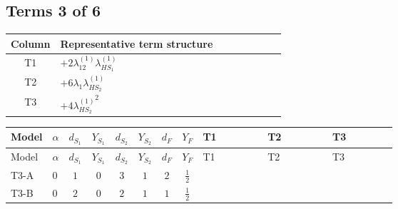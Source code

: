 \documentclass[8pt]{article}
\begin{document}
\begin{landscape}
\subsection*{Terms 3 of 6}
\begin{center}
\begin{tabular}{@{}c >{\raggedright\arraybackslash}p{0.82\linewidth}@{}}
\toprule
Column & Representative term structure \\
\midrule
T1 & \(\displaystyle +2 {\lambda_{12}^{(1)}} {\lambda_{HS_1}^{(1)}}\) \\
\midrule
T2 & \(\displaystyle +6 {\lambda_1} {\lambda_{HS_2}^{(1)}}\) \\
\midrule
T3 & \(\displaystyle +4 {\lambda_{HS_2}^{(1)}}^2\) \\
\midrule
\bottomrule
\end{tabular}
\end{center}
\smallskip
\tiny
\begin{longtable}{@{}llcccccc >{\raggedright\arraybackslash}p{0.21\linewidth} >{\raggedright\arraybackslash}p{0.21\linewidth} >{\raggedright\arraybackslash}p{0.21\linewidth}@{}}
\toprule
Model & $\alpha$ & $d_{S_1}$ & $Y_{S_1}$ & $d_{S_2}$ & $Y_{S_2}$ & $d_F$ & $Y_F$ & T1 & T2 & T3 \\
\midrule
\endfirsthead
\toprule
Model & $\alpha$ & $d_{S_1}$ & $Y_{S_1}$ & $d_{S_2}$ & $Y_{S_2}$ & $d_F$ & $Y_F$ & T1 & T2 & T3 \\
\midrule
\endhead
T3-A & $0$ & $1$ & $0$ & $3$ & $1$ & $2$ & $\frac{1}{2}$ & \scriptsize\adjustbox{max width=\linewidth}{$\begin{gathered} +2 {\lambda_{12}^{(1)}} {\lambda_{HS_1}^{(1)}}\end{gathered}$} & \scriptsize\adjustbox{max width=\linewidth}{$\begin{gathered} +6 {\lambda_1} {\lambda_{HS_2}^{(1)}}\end{gathered}$} & \scriptsize\adjustbox{max width=\linewidth}{$\begin{gathered} +4 {\lambda_{HS_2}^{(1)}}^2\end{gathered}$} \\
\midrule
T3-B & $0$ & $2$ & $0$ & $2$ & $1$ & $1$ & $\frac{1}{2}$ & \scriptsize\adjustbox{max width=\linewidth}{$\begin{gathered} +4 {\lambda_{12}^{(1)}} {\lambda_{HS_1}^{(1)}}\end{gathered}$} & \scriptsize\adjustbox{max width=\linewidth}{$\begin{gathered} +6 {\lambda_1} {\lambda_{HS_2}^{(1)}}\end{gathered}$} & \scriptsize\adjustbox{max width=\linewidth}{$\begin{gathered} +4 {\lambda_{HS_2}^{(1)}}^2\end{gathered}$} \\

\end{longtable}
\end{landscape}
\end{document}
